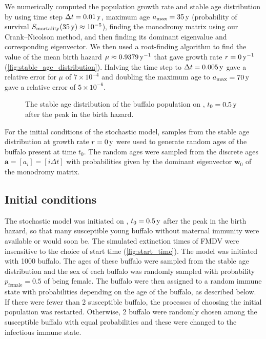 \documentclass[12pt, USenglish]{article}  %
\renewcommand{\vec}[1]{\mathbf{#1}}
\begin{document}
We numerically computed the population growth rate and stable age
distribution by using time step $\Delta t = \unit[0.01]{y}$,
maximum age $a_{\text{max}} = \unit[35]{y}$
(probability of survival
$S_{\text{mortality}}(\unit[35]{y}) \approx 10^{-5}$),
finding the monodromy matrix using our Crank--Nicolson method, and
then finding its dominant eigenvalue and corresponding eigenvector.
We then used a root-finding algorithm to find the value of the mean
birth hazard $\mu \approx \unit[0.9379]{y^{-1}}$ that gave growth rate
$r = \unit[0]{y^{-1}}$
(\autoref{fig:stable_age_distribution}). Halving the time step to
$\Delta t = \unit[0.005]{y}$ gave a relative error for $\mu$
of $7 \times 10^{-4}$ and doubling the maximum age to $a_{\text{max}}
= \unit[70]{y}$ gave a relative error of $5 \times 10^{-6}$.

\begin{figure}
  \centering
  \begin{sansmath}
    
  \end{sansmath}
  \caption{The stable age distribution of the buffalo population
    on {\printyearoff{}}, $t_0 = \unit[0.5]{y}$
    after the peak in the birth hazard.}
  \label{fig:stable_age_distribution}
\end{figure}

For the initial conditions of the stochastic model, samples from the
stable age distribution at growth rate $r = \unit[0]{y}$ were used to
generate random ages of the buffalo present at time $t_0$. The random ages
were sampled from the discrete ages $\vec{a} = [a_i] = [i \Delta t]$
with probabilities given by the dominant eigenvector $\vec{w}_0$ of
the monodromy matrix.


\subsection{Initial conditions}
\label{initial_conditions}

The stochastic model was initiated on
{\printyearoff{}}, $t_0 = \unit[0.5]{y}$ after the
peak in the birth hazard, so that many susceptible young buffalo
without maternal immunity were available or would soon be. The
simulated extinction times of FMDV were insensitive to the choice of
start time (\autoref{fig:start_time}). The model was initiated with
1000 buffalo. The ages of these buffalo were sampled from the stable
age distribution and the sex of each buffalo was randomly sampled with
probability $p_{\text{female}} = 0.5$ of being female. The buffalo
were then assigned to a random immune state with probabilities
depending on the age of the buffalo, as described below. If there were
fewer than 2 susceptible buffalo, the processes of choosing the
initial population was restarted. Otherwise, 2 buffalo were randomly
chosen among the susceptible buffalo with equal probabilities and
these were changed to the infectious immune state.
\end{document}
